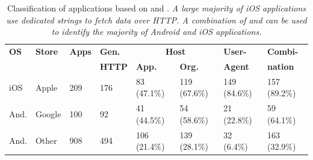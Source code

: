 

\begin{table} 
     \centering
     \begin{small}
     \begin{tabular}{|p{}|p{}|p{}|p{}|p{}|p{}|p{}|p{}|}
        \hline
        {\bf OS}&{\bf Store}&{\bf Apps}&{\bf Gen.}&\multicolumn{2}{|c|}{\bf Host} & {\bf User-}&{\bf Combi-} \tabularnewline
        \cline{5-6}    
             &        &     & {\bf HTTP} & {\bf App. } & {\bf Org.}& \bf{Agent}   & \bf{nation}  \tabularnewline                
        \hline    
        iOS  & Apple  & 209 & 176 & 83 (47.1\%)  &  119 (67.6\%)   &  149 (84.6\%)& 157 (89.2\%) \tabularnewline
        \hline
        And. & Google & 100 & 92  & 41 (44.5\%)  &  54 (58.6\%)    &  21 (22.8\%) &  59 (64.1\%)  \tabularnewline
        \hline    
        And. & Other  & 908 & 494 & 106 (21.4\%) & 139 (28.1\%)     &  32 (6.4\%)  &  163 (32.9\%)  \tabularnewline
        \hline
     \end{tabular}
     \end{small}
     \caption{Classification of applications based on \httphost and \useragent. \emph{A large majority of iOS applications use dedicated \useragent strings to fetch data over HTTP. A combination of \useragent and \httphost can be used to identify the majority of Android and iOS applications.} }
     \label{tab:classification-success}
\end{table}

